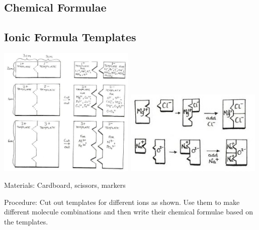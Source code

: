 \begin{multicols}{2}

\section*{Chemical Formulae}


\subsection{Ionic Formula Templates}

\begin{center}
\includegraphics[width=0.49\textwidth]{./img/source/ion-template.jpg}
\includegraphics[width=0.49\textwidth]{./img/source/ion-template-2.jpg}
\end{center}

\begin{description*}
\item[Materials:]{Cardboard, scissors, markers}
\item[Procedure:]{Cut out templates for different ions as shown. Use them to make different molecule combinations and then write their chemical formulae based on the templates.}
\end{description*}


\end{multicols}

\pagebreak